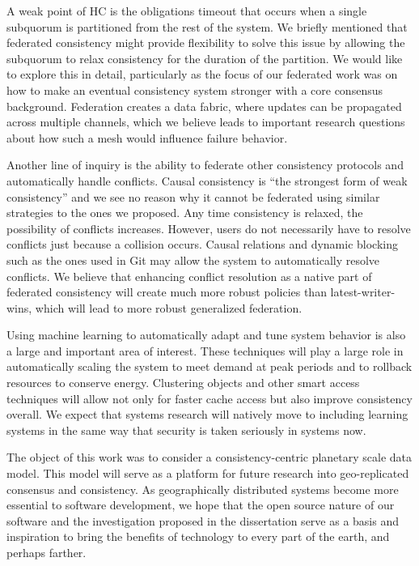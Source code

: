 A weak point of HC is the obligations timeout that occurs when a single subquorum is partitioned from the rest of the system.
We briefly mentioned that federated consistency might provide flexibility to solve this issue by allowing the subquorum to relax consistency for the duration of the partition.
We would like to explore this in detail, particularly as the focus of our federated work was on how to make an eventual consistency system stronger with a core consensus background.
Federation creates a data fabric, where updates can be propagated across multiple channels, which we believe leads to important research questions about how such a mesh would influence failure behavior.

Another line of inquiry is the ability to federate other consistency protocols and automatically handle conflicts.
Causal consistency is ``the strongest form of weak consistency'' and we see no reason why it cannot be federated using similar strategies to the ones we proposed.
Any time consistency is relaxed, the possibility of conflicts increases.
However, users do not necessarily have to resolve conflicts just because a collision occurs.
Causal relations and dynamic blocking such as the ones used in Git may allow the system to automatically resolve conflicts.
We believe that enhancing conflict resolution as a native part of federated consistency will create much more robust policies than latest-writer-wins, which will lead to more robust generalized federation.

Using machine learning to automatically adapt and tune system behavior is also a large and important area of interest.
These techniques will play a large role in automatically scaling the system to meet demand at peak periods and to rollback resources to conserve energy.
Clustering objects and other smart access techniques will allow not only for faster cache access but also improve consistency overall.
We expect that systems research will natively move to including learning systems in the same way that security is taken seriously in systems now.

The object of this work was to consider a consistency-centric planetary scale data model.
This model will serve as a platform for future research into geo-replicated consensus and consistency.
As geographically distributed systems become more essential to software development, we hope that the open source nature of our software and the investigation proposed in the dissertation serve as a basis and inspiration
to bring the benefits of technology to every part of the earth, and perhaps farther.
